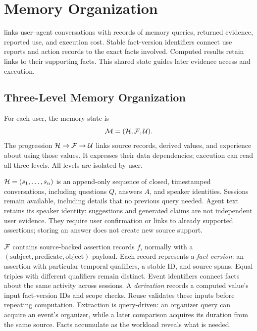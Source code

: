 \section{Memory Organization}
\label{sec:overview}



\sys{} links user--agent conversations with records of memory queries,
returned evidence, reported use, and execution cost. Stable fact-version
identifiers connect use reports and action records to the exact facts
involved. Computed results retain links to their supporting facts.
This shared state guides later evidence access and execution.

\subsection{Three-Level Memory Organization}
\label{subsec:new-state}

For each user, the memory state is
\begin{equation}
\label{eq:new-state}
\mathcal{M}=(\mathcal{H},\mathcal{F},\mathcal{U}).
\end{equation}
The progression $\mathcal{H}\rightarrow\mathcal{F}\rightarrow\mathcal{U}$ links source records,
derived values, and experience about using those values. It expresses
their data dependencies; execution can read all three levels.
All levels are isolated by user.

$\mathcal{H}=(s_1,\ldots,s_n)$ is an append-only sequence of closed,
timestamped conversations, including questions $Q$, answers $A$, and
speaker identities. Sessions remain available, including details that
no previous query needed. Agent text retains its speaker identity:
suggestions and generated claims are not independent user evidence.
They require user confirmation or links to already supported assertions;
storing an answer does not create new source support.

$\mathcal{F}$ contains source-backed assertion records $f$, normally with a
$(\mathrm{subject},\mathrm{predicate},\mathrm{object})$ payload.
Each record represents a \emph{fact version}: an assertion with particular
temporal qualifiers, a stable ID, and source spans. Equal triples with
different qualifiers remain distinct.
Event identifiers connect facts about the same activity across sessions.
A \emph{derivation} records a computed value's input fact-version IDs and
scope checks. Reuse validates these inputs before repeating computation.
Extraction is query-driven: an organizer query can acquire an event's
organizer, while a later comparison acquires its duration from the same
source. Facts accumulate as the workload reveals what is needed.

